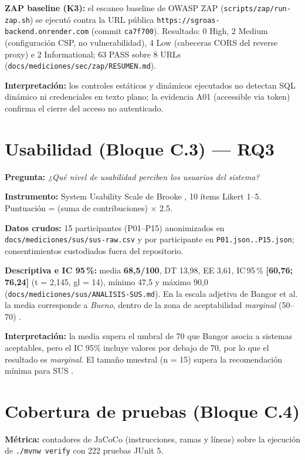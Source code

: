 \textbf{ZAP baseline (K3):} el escaneo baseline de OWASP ZAP
(\texttt{scripts/zap/run-zap.sh}) se ejecutó contra la URL pública
\texttt{https://sgroas-backend.onrender.com} (commit \texttt{ca7f700}). Resultado: 0
High, 2 Medium (configuración CSP, no vulnerabilidad), 4 Low (cabeceras CORS del
reverse proxy) e 2 Informational; 63 PASS sobre 8 URLs
(\texttt{docs/mediciones/sec/zap/RESUMEN.md}).

\textbf{Interpretación:} los controles estáticos y dinámicos ejecutados no detectan
SQL dinámico ni credenciales en texto plano; la evidencia A01 (accessible via
token) confirma el cierre del acceso no autenticado.

\section{Usabilidad (Bloque C.3) — RQ3}
\label{sec:sus}

\textbf{Pregunta:} \emph{¿Qué nivel de usabilidad perciben los usuarios del
sistema?}

\textbf{Instrumento:} System Usability Scale de Brooke \cite{brooke1996}, 10 ítems
Likert 1--5. Puntuación = (suma de contribuciones) $\times$ 2.5.

\textbf{Datos crudos:} 15 participantes (P01--P15) anonimizados en
\texttt{docs/mediciones/sus/sus-raw.csv} y por participante en
\texttt{P01.json..P15.json}; consentimientos custodiados fuera del repositorio.

\textbf{Descriptiva e IC 95\,\%:} media \textbf{68,5/100}, DT 13,98, EE 3,61, IC\,95\,\%
\textbf{[60,76; 76,24]} (t = 2,145, gl = 14), mínimo 47,5 y máximo 90,0
(\texttt{docs/mediciones/sus/ANALISIS-SUS.md}). En la escala adjetiva de Bangor et
al. \cite{bangor2009,bangor2008} la media corresponde a \emph{Bueno}, dentro de la
zona de aceptabilidad \emph{marginal} (50--70) \cite{lewis2009}.

\textbf{Interpretación:} la media supera el umbral de 70 que Bangor asocia a
sistemas aceptables, pero el IC 95\% incluye valores por debajo de 70, por lo que
el resultado es \emph{marginal}. El tamaño muestral (n = 15) supera la
recomendación mínima para SUS \cite{kortum2013}.

\section{Cobertura de pruebas (Bloque C.4)}
\label{sec:cobertura}

\textbf{Métrica:} contadores de JaCoCo (instrucciones, ramas y líneas) sobre la
ejecución de \texttt{./mvnw verify} con 222 pruebas JUnit 5.

